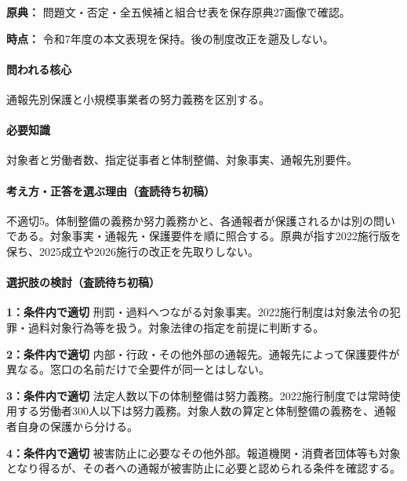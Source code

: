 \noindent\textbf{原典：} 問題文・否定・全五候補と組合せ表を保存原典27画像で確認。\par

\noindent\textbf{時点：} 令和7年度の本文表現を保持。後の制度改正を遡及しない。\par

\paragraph{問われる核心} 通報先別保護と小規模事業者の努力義務を区別する。

\paragraph{必要知識} 対象者と労働者数、指定従事者と体制整備、対象事実、通報先別要件。

\paragraph{考え方・正答を選ぶ理由（査読待ち初稿）} 不適切5。体制整備の義務か努力義務かと、各通報者が保護されるかは別の問いである。対象事実・通報先・保護要件を順に照合する。原典が指す2022施行版を保ち、2025成立や2026施行の改正を先取りしない。

\paragraph{選択肢の検討（査読待ち初稿）}\mbox{}\par

\noindent\textbf{1：条件内で適切} 刑罰・過料へつながる対象事実。2022施行制度は対象法令の犯罪・過料対象行為等を扱う。対象法律の指定を前提に判断する。\par

\noindent\textbf{2：条件内で適切} 内部・行政・その他外部の通報先。通報先によって保護要件が異なる。窓口の名前だけで全要件が同一とはしない。\par

\noindent\textbf{3：条件内で適切} 法定人数以下の体制整備は努力義務。2022施行制度では常時使用する労働者300人以下は努力義務。対象人数の算定と体制整備の義務を、通報者自身の保護から分ける。\par

\noindent\textbf{4：条件内で適切} 被害防止に必要なその他外部。報道機関・消費者団体等も対象となり得るが、その者への通報が被害防止に必要と認められる条件を確認する。\par

